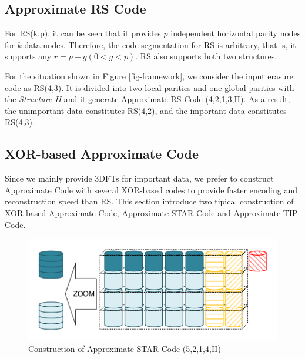 \documentclass[sigconf]{acmart}
\begin{document}
\subsection{Approximate RS Code}
For RS(k,p), it can be seen that it provides $p$ independent horizontal parity nodes for $k$ data nodes. Therefore, the code segmentation for RS is arbitrary, that is, it supports any $r=p-g(0<g<p)$. RS also supports both two structures. 

For the situation shown in Figure \ref{fig-framework}, we consider the input erasure code as RS(4,3). It is divided into two local parities and one global parities with the \emph{Structure II} and it generate Approximate RS Code (4,2,1,3,II).
As a result, the unimportant data constitutes RS(4,2), and the important data constitutes RS(4,3).


\subsection{XOR-based Approximate Code}
Since we mainly provide 3DFTs for important data, we prefer to construct Approximate Code with several XOR-based codes to provide faster encoding and reconstruction speed than RS. This section introduce two tipical construction of XOR-based Approximate Code, Approximate STAR Code and Approximate TIP Code.


\begin{figure}[ht]
\centering
\includegraphics[width=0.8\linewidth]{photo/AP-5214.pdf}
\caption{Construction of Approximate STAR Code (5,2,1,4,II)}
\label{fig-ap-5214}
\end{figure}
\end{document}

